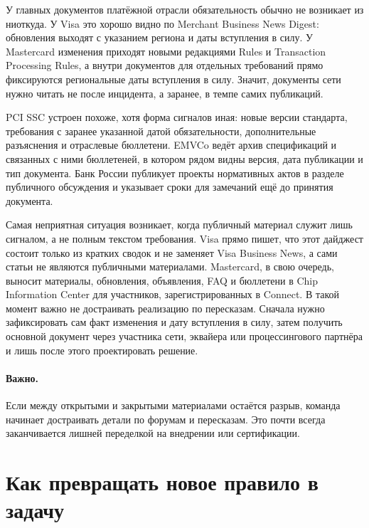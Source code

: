 У главных документов платёжной отрасли обязательность обычно
не возникает из ниоткуда. У Visa это хорошо видно
по Merchant Business News Digest: обновления выходят с указанием
региона и даты вступления в силу. У Mastercard изменения
приходят новыми редакциями Rules и Transaction Processing Rules,
а внутри документов для отдельных требований прямо фиксируются
региональные даты вступления в
силу.\cite{visa-business-news-digest,mc-rules,mc-tpr}
Значит, документы сети нужно читать не после инцидента, а заранее,
в темпе самих публикаций.

PCI SSC устроен похоже, хотя форма сигналов иная: новые версии
стандарта, требования с заранее указанной датой обязательности,
дополнительные разъяснения и отраслевые
бюллетени.\cite{pci-dss-4,pci-faq-1585,pci-format4-suspension}
EMVCo ведёт архив спецификаций и связанных с ними бюллетеней,
в котором рядом видны версия, дата публикации и тип
документа.\cite{emvco-bulletins-archive}
Банк России публикует проекты нормативных актов в разделе
публичного обсуждения и указывает сроки для замечаний ещё
до принятия документа.\cite{cbr-project-na}

Самая неприятная ситуация возникает, когда публичный материал
служит лишь сигналом, а не полным текстом требования. Visa прямо
пишет, что этот дайджест состоит только из кратких сводок
и не заменяет Visa Business News, а сами статьи не являются
публичными материалами. Mastercard, в свою очередь, выносит
материалы, обновления, объявления, FAQ и бюллетени в Chip
Information Center для участников, зарегистрированных
в Connect.\cite{visa-business-news-digest,mc-chip-info-center}
В такой момент важно не достраивать реализацию по пересказам.
Сначала нужно зафиксировать сам факт изменения и дату вступления
в силу, затем получить основной документ через участника сети,
эквайера или процессингового партнёра и лишь после этого
проектировать решение.
\paragraph{Важно.}
Если между открытыми и закрытыми материалами остаётся разрыв, команда
начинает достраивать детали по форумам и пересказам. Это почти всегда
заканчивается лишней переделкой на внедрении или сертификации.

\section{Как превращать новое правило в задачу}
\label{sec:ps-tracking-triage}

